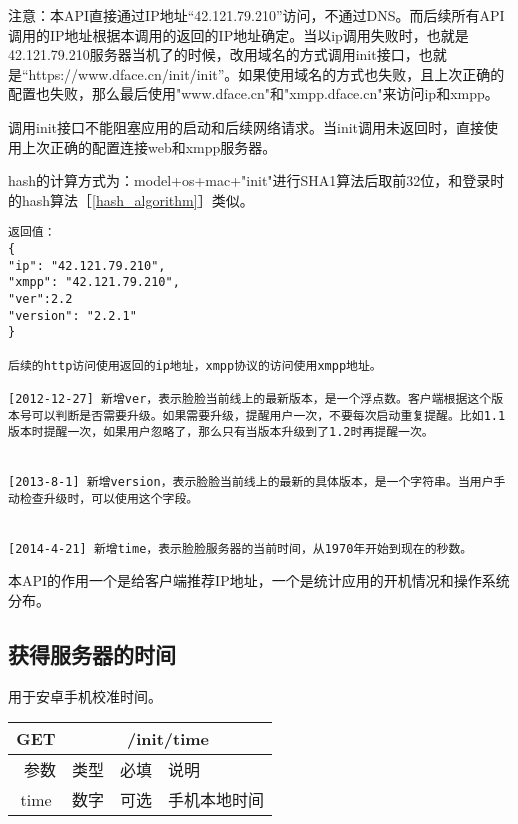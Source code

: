 \documentclass[cs4size]{ctexartutf8}
\begin{document}
注意：本API直接通过IP地址“42.121.79.210”访问，不通过DNS。而后续所有API调用的IP地址根据本调用的返回的IP地址确定。当以ip调用失败时，也就是42.121.79.210服务器当机了的时候，改用域名的方式调用init接口，也就是“https://www.dface.cn/init/init”。如果使用域名的方式也失败，且上次正确的配置也失败，那么最后使用"www.dface.cn"和"xmpp.dface.cn"来访问ip和xmpp。

调用init接口不能阻塞应用的启动和后续网络请求。当init调用未返回时，直接使用上次正确的配置连接web和xmpp服务器。

hash的计算方式为：model+os+mac+"init"进行SHA1算法后取前32位，和登录时的hash算法［\ref{hash_algorithm}］类似。

\begin{verbatim}
返回值：
{
"ip": "42.121.79.210",
"xmpp": "42.121.79.210",
"ver":2.2
"version": "2.2.1"
}

后续的http访问使用返回的ip地址，xmpp协议的访问使用xmpp地址。

[2012-12-27] 新增ver，表示脸脸当前线上的最新版本，是一个浮点数。客户端根据这个版本号可以判断是否需要升级。如果需要升级，提醒用户一次，不要每次启动重复提醒。比如1.1版本时提醒一次，如果用户忽略了，那么只有当版本升级到了1.2时再提醒一次。


[2013-8-1] 新增version，表示脸脸当前线上的最新的具体版本，是一个字符串。当用户手动检查升级时，可以使用这个字段。


[2014-4-21] 新增time，表示脸脸服务器的当前时间，从1970年开始到现在的秒数。

\end{verbatim}

本API的作用一个是给客户端推荐IP地址，一个是统计应用的开机情况和操作系统分布。

\subsection{获得服务器的时间}

用于安卓手机校准时间。
\begin{table}[H]
   \begin{center}
\begin{tabular}{|c|c|c|p{12cm}|}
\hline
GET & \multicolumn{3}{|c|}{/init/time} \\
\hline\hline
 \  参数  & 类型 & 必填 &  说明  \\
 \hline
 time  & 数字 & 可选 &  手机本地时间\\
\hline
\end{tabular}
   \end{center}
\end{table}
\end{document}
